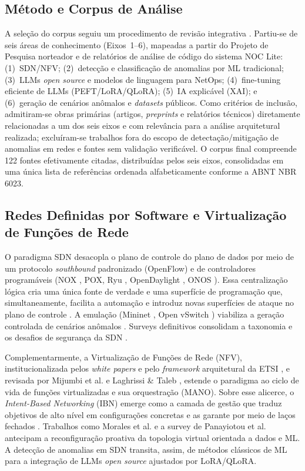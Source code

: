 \documentclass[12pt,a4paper]{article}
\begin{document}
\subsection{Método e Corpus de Análise}
\label{sec:metodo}

A seleção do corpus seguiu um procedimento de revisão integrativa
\cite{rA28}\cite{rA212}. Partiu-se de seis áreas de conhecimento
(Eixos~1--6), mapeadas a partir do Projeto de Pesquisa norteador
\cite{rRODRIGUES} e de relatórios de análise de código do sistema NOC
Lite: (1)~SDN/NFV; (2)~detecção e classificação de anomalias por ML
tradicional; (3)~LLMs \textit{open source} e modelos de linguagem para
NetOps; (4)~fine-tuning eficiente de LLMs (PEFT/LoRA/QLoRA); (5)~IA
explicável (XAI); e (6)~geração de cenários anômalos e \textit{datasets}
públicos. Como critérios de inclusão, admitiram-se obras primárias
(artigos, \textit{preprints} e relatórios técnicos) diretamente
relacionadas a um dos seis eixos e com relevância para a análise
arquitetural realizada; excluíram-se trabalhos fora do escopo de
detectação/mitigação de anomalias em redes e fontes sem validação
verificável. O corpus final compreende 122 fontes efetivamente citadas,
distribuídas pelos seis eixos, consolidadas em uma única lista de
referências ordenada alfabeticamente conforme a ABNT NBR 6023.

\subsection{Redes Definidas por Software e Virtualização de Funções de Rede}
\label{sec:sdn}

O paradigma SDN desacopla o plano de controle do plano de dados por meio de um
protocolo \textit{southbound} padronizado (OpenFlow) \cite{rA11} e de controladores
programáveis (NOX \cite{rA12}, POX, Ryu \cite{rA116}, OpenDaylight \cite{rA114}, ONOS \cite{rA115}).
Essa centralização lógica cria uma única fonte de verdade e uma superfície de
programação que, simultaneamente, facilita a automação e introduz novas
superfícies de ataque no plano de controle \cite{rA122}\cite{rA123}\cite{rA124}. A emulação
(Mininet \cite{rA14}, Open vSwitch \cite{rA15}) viabiliza a geração controlada de cenários
anômalos \cite{rA19}. Surveys definitivos consolidam a taxonomia e os desafios de
segurança da SDN \cite{rA19}\cite{rA110}.

Complementarmente, a Virtualização de Funções de Rede (NFV), institucionalizada
pelos \textit{white papers} e pelo \textit{framework} arquitetural da ETSI
\cite{rA127}\cite{rA128}\cite{rA129}, e revisada por Mijumbi et al. \cite{rA130}\cite{rA131} e Laghrissi \&
Taleb \cite{rA132}, estende o paradigma ao ciclo de vida de funções virtualizadas e
sua orquestração (MANO). Sobre esse alicerce, o \textit{Intent-Based
Networking} (IBN) emerge como a camada de gestão que traduz objetivos de alto
nível em configurações concretas e as garante por meio de laços fechados
\cite{rA133}. Trabalhos como Morales et al. \cite{rA134} e a survey de Panayiotou et al.
\cite{rA135} antecipam a reconfiguração proativa da topologia virtual orientada a
dados e ML. A detecção de anomalias em SDN transita, assim, de métodos
clássicos de ML \cite{rA126} para a integração de LLMs \textit{open source}
ajustados por LoRA/QLoRA.
\end{document}
